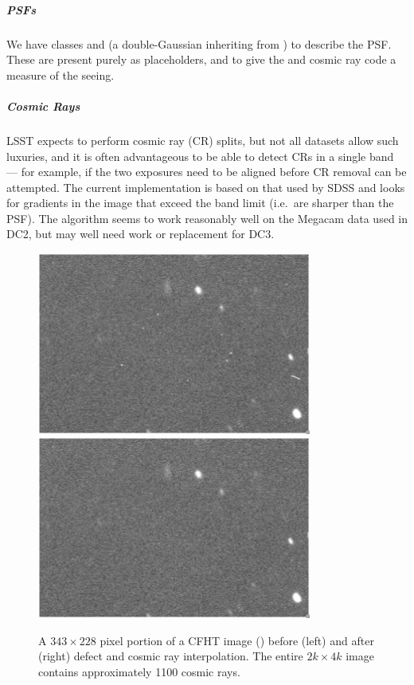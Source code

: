 \subparagraph{PSFs}
We have classes  and  (a double-Gaussian
inheriting from ) to describe the PSF.  These are
present purely as placeholders, and to give the 
and cosmic ray code a measure of the seeing.

\subparagraph{Cosmic Rays}
LSST expects to perform cosmic ray (CR) splits, but not all datasets
allow such luxuries, and it is often advantageous to be able to
detect CRs in a single band --- for example, if the two exposures
need to be aligned before CR removal can be attempted.  The current
implementation is based on that used by SDSS and looks for gradients
in the image that exceed the band limit (i.e.~are sharper than
the PSF).  The algorithm seems to work reasonably well on the
Megacam data used in DC2, but may well need work or replacement
for DC3.

\begin{figure}[htbp]
  \begin{center}
    \includegraphics[height=60mm,angle=90]{figures/CR-before}
    \includegraphics[height=60mm,angle=90]{figures/CR-after}
  \end{center}
\caption{A $343\times228$ pixel portion of a CFHT image ()
  before (left) and after (right) defect and cosmic ray interpolation. The entire
  $2k\times4k$ image contains approximately 1100 cosmic rays.
}
\label{FigCRbefore}
\end{figure}
